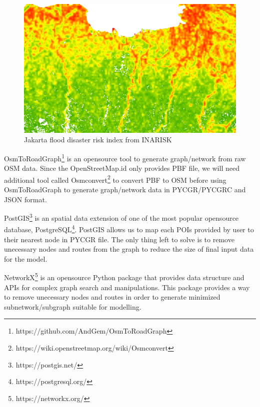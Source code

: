 \documentclass[conference]{IEEEtran}
\begin{document}
\begin{figure}
\centerline{\includegraphics[scale=0.3]{jakarta_flood_risk_layer_inarisk.png}}
\caption{Jakarta flood disaster risk index from INARISK}
\label{fig_jakarta_flood_risk_layer_inarisk}
\end{figure}

OsmToRoadGraph\footnote{https://github.com/AndGem/OsmToRoadGraph} is an opensource tool to generate graph/network from raw OSM data. Since the OpenStreetMap.id only provides PBF file, we will need additional tool called Osmconvert\footnote{https://wiki.openstreetmap.org/wiki/Osmconvert} to convert PBF to OSM before using OsmToRoadGraph to generate graph/network data in PYCGR/PYCGRC and JSON format.

PostGIS\footnote{https://postgis.net/} is an spatial data extension of one of the most popular opensource database, PostgreSQL\footnote{https://postgresql.org/}. PostGIS allows us to map each POIs provided by user to their nearest node in PYCGR file. The only thing left to solve is to remove unecessary nodes and routes from the graph to reduce the size of final input data for the model.

NetworkX\footnote{https://networkx.org/} is an opensource Python package that provides data structure and APIs for complex graph search and manipulations. This package provides a way to remove unecessary nodes and routes in order to generate minimized subnetwork/subgraph suitable for modelling.


\end{document}
